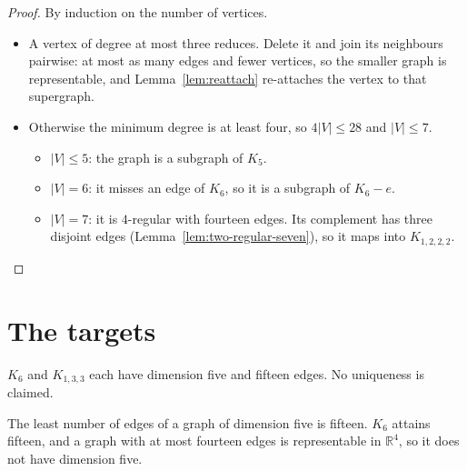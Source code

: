 \begin{proof}
  \leanok
  By induction on the number of vertices.
  \begin{itemize}
    \item A vertex of degree at most three reduces. Delete it and join its neighbours pairwise:
      at most as many edges and fewer vertices, so the smaller graph is representable, and
      Lemma~\ref{lem:reattach} re-attaches the vertex to that supergraph.
    \item Otherwise the minimum degree is at least four, so $4|V| \le 28$ and $|V| \le 7$.
      \begin{itemize}
        \item $|V| \le 5$: the graph is a subgraph of $K_5$.
        \item $|V| = 6$: it misses an edge of $K_6$, so it is a subgraph of $K_6 - e$.
        \item $|V| = 7$: it is $4$-regular with fourteen edges. Its complement has three
          disjoint edges (Lemma~\ref{lem:two-regular-seven}), so it maps into $K_{1,2,2,2}$.
      \end{itemize}
  \end{itemize}
\end{proof}

\section{The targets}

\begin{theorem}
  \label{thm:attainment}
  \leanok
  $K_6$ and $K_{1,3,3}$ each have dimension five and fifteen edges. No uniqueness is claimed.
\end{theorem}

\begin{theorem}
  \label{thm:dimension-five}
  \leanok
  The least number of edges of a graph of dimension five is fifteen. $K_6$ attains fifteen, and
  a graph with at most fourteen edges is representable in $\mathbb{R}^4$, so it does not have
  dimension five.
\end{theorem}
